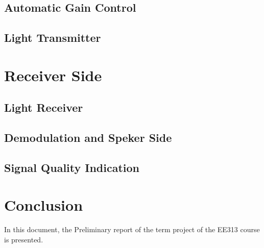 \documentclass[a4paper,10pt]{report}
\begin{document}
\subsection{Automatic Gain Control}
\subsection{Light Transmitter}
\section{Receiver Side}
\subsection{Light Receiver}
\subsection{Demodulation and Speker Side}
\subsection{Signal Quality Indication}

\section{Conclusion}
In this document, the Preliminary report of the term project of the EE313 course is presented. 
\end{document}
